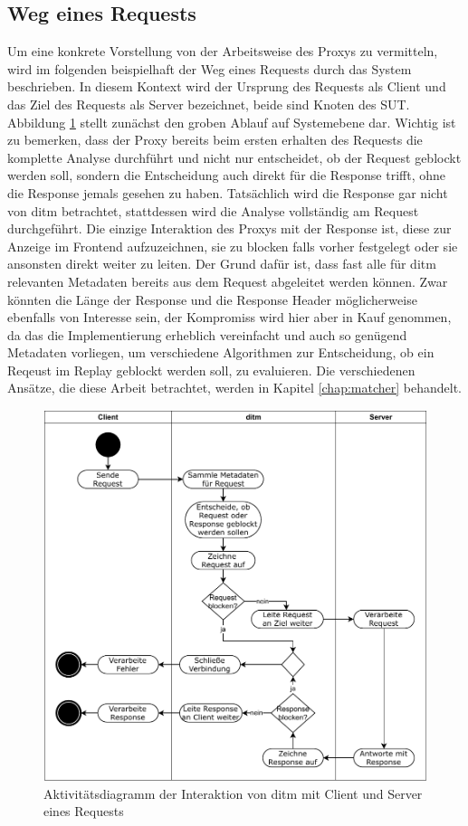 \documentclass[12pt,a4paper]{report}
\begin{document}
\subsection{Weg eines Requests}
Um eine konkrete Vorstellung von der Arbeitsweise des Proxys zu vermitteln, wird im folgenden beispielhaft der Weg eines
Requests durch das System beschrieben. In diesem Kontext wird der Ursprung des Requests als Client und das Ziel des
Requests als Server bezeichnet, beide sind Knoten des SUT. Abbildung \ref{fig:activity} stellt zunächst den groben Ablauf auf Systemebene dar.
Wichtig ist zu bemerken, dass der Proxy bereits beim ersten erhalten des Requests die komplette Analyse durchführt und
nicht nur entscheidet, ob der Request geblockt werden soll, sondern die Entscheidung auch direkt für die Response trifft,
ohne die Response jemals gesehen zu haben. Tatsächlich wird die Response gar nicht von ditm betrachtet, stattdessen wird
die Analyse vollständig am Request durchgeführt. Die einzige Interaktion des Proxys mit der Response ist, diese zur Anzeige im
Frontend aufzuzeichnen, sie zu blocken falls vorher festgelegt oder sie ansonsten direkt weiter zu leiten.
Der Grund dafür ist, dass fast alle für ditm relevanten Metadaten bereits aus dem Request abgeleitet werden können. Zwar
könnten die Länge der Response und die Response Header möglicherweise ebenfalls von Interesse sein, der Kompromiss wird
hier aber in Kauf genommen, da das die Implementierung erheblich vereinfacht und auch so genügend Metadaten vorliegen,
um verschiedene Algorithmen zur Entscheidung, ob ein Reqeust im Replay geblockt werden soll, zu evaluieren.
Die verschiedenen Ansätze, die diese Arbeit betrachtet, werden in Kapitel \ref{chap:matcher} behandelt.
\begin{figure}[H]
	\centering
	\includegraphics[width=\linewidth]{img/ditm-Activity.pdf}
	\caption{Aktivitätsdiagramm der Interaktion von ditm mit Client und Server eines Requests}
	\label{fig:activity}
\end{figure}
\end{document}
